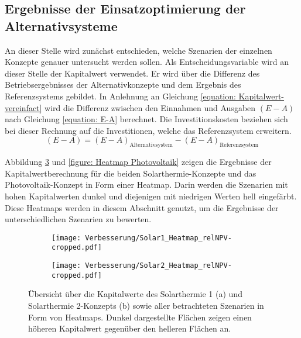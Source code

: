 \subsection{Ergebnisse der Einsatzoptimierung der Alternativsysteme}
An dieser Stelle wird zunächst entschieden, welche Szenarien der einzelnen Konzepte genauer untersucht werden sollen. Als Entscheidungsvariable wird an dieser Stelle der Kapitalwert verwendet. Er wird über die Differenz des Betriebsergebnisses der Alternativkonzepte und dem Ergebnis des Referenzsystems gebildet. In Anlehnung an Gleichung \ref{equation: Kapitalwert-vereinfact} wird die Differenz zwischen den Einnahmen und Ausgaben $(E - A)$ nach Gleichung \ref{equation: E-A} berechnet. Die Investitionskosten beziehen sich bei dieser Rechnung auf die Investitionen, welche das Referenzsystem erweitern.
	\begin{equation}
	\label{equation: E-A}
		(E - A) = (E - A)_\text{Alternativsystem} - (E - A)_\text{Referenzsystem}
	\end{equation}

Abbildung \ref{fig: Heatmaps Solarthermie} und \ref{figure: Heatmap Photovoltaik} zeigen die Ergebnisse der Kapitalwertberechnung für die beiden Solarthermie-Konzepte und das Photovoltaik-Konzept in Form einer Heatmap. Darin werden die Szenarien mit hohen Kapitalwerten dunkel und diejenigen mit niedrigen Werten hell eingefärbt. Diese Heatmaps werden in diesem Abschnitt genutzt, um die Ergebnisse der unterschiedlichen Szenarien zu bewerten.
	\begin{figure}
		\begin{subfigure}[b]{0.48\textwidth}
			\texttt{[image: Verbesserung/Solar1\_Heatmap\_relNPV-cropped.pdf]}
			\label{fig: Heatmaps Solarthermie a}
		\end{subfigure}
		\hfill
		\begin{subfigure}[b]{0.48\textwidth}
			\texttt{[image: Verbesserung/Solar2\_Heatmap\_relNPV-cropped.pdf]}
			\label{fig: Heatmaps Solarthermie b}
		\end{subfigure}
		\caption[Übersicht über die Kapitalwerte der Solarthermie Konzepte]{Übersicht über die Kapitalwerte des Solarthermie 1 (a) und Solarthermie 2-Konzepts (b) sowie aller betrachteten Szenarien in Form von Heatmaps. Dunkel dargestellte Flächen zeigen einen höheren Kapitalwert gegenüber den helleren Flächen an.}
		\label{fig: Heatmaps Solarthermie}
	\end{figure}

